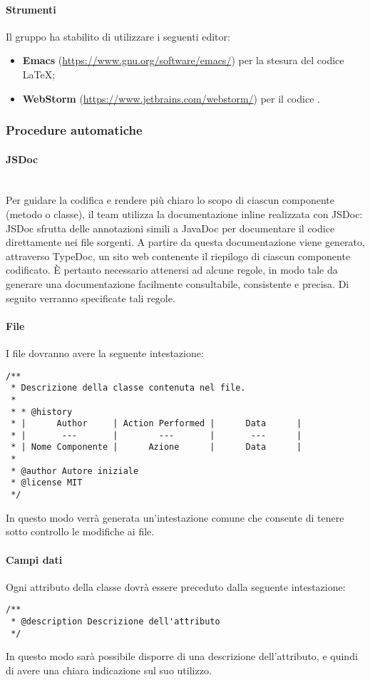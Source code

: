                 \paragraph*{Strumenti}
                Il gruppo ha stabilito di utilizzare i seguenti editor:
                \begin{itemize}
                  \item \textbf{Emacs} (\url{https://www.gnu.org/software/emacs/}) per la stesura del codice \LaTeX; 
                  \item \textbf{WebStorm} (\url{https://www.jetbrains.com/webstorm/}) per il codice .
                \end{itemize}
             
\subsubsection{Procedure automatiche}
\paragraph{JSDoc} \mbox{} \\
Per guidare la codifica e rendere più chiaro lo scopo di ciascun componente (metodo o classe), il team utilizza la documentazione inline realizzata con JSDoc: JSDoc sfrutta delle annotazioni simili a JavaDoc per documentare il codice direttamente nei file sorgenti. A partire da questa documentazione viene generato, attraverso TypeDoc, un sito web contenente il riepilogo di ciascun componente codificato. È pertanto necessario attenersi ad alcune regole, in modo tale da generare una documentazione facilmente consultabile, consistente e precisa. Di seguito verranno specificate tali regole.
\paragraph*{File}
I file dovranno avere la seguente intestazione:
\begin{verbatim}
/**
 * Descrizione della classe contenuta nel file.
 *
 * * @history
 * |      Author     | Action Performed |      Data      |
 * |       ---       |        ---       |       ---      |
 * | Nome Componente |      Azione      |      Data	     |
 *
 * @author Autore iniziale
 * @license MIT
 */
\end{verbatim}
In questo modo verrà generata un'intestazione comune che consente di tenere sotto controllo le modifiche ai file.
\paragraph*{Campi dati}
Ogni attributo della classe dovrà essere preceduto dalla seguente intestazione:
\begin{verbatim}
/**
 * @description Descrizione dell'attributo
 */
\end{verbatim}
In questo modo sarà possibile disporre di una descrizione dell'attributo, e quindi di avere una chiara indicazione sul suo utilizzo.
